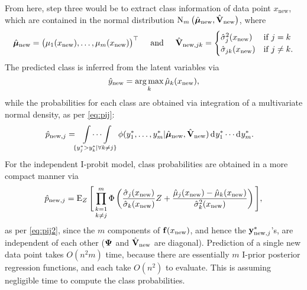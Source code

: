 From here, step three would be to extract class information of data point $x_\text{new}$, which are contained in the normal distribution $\operatorname{N}_{m}\big(\hat{{\bm\mu}}_{\text{new}}, \hat{{\mathbf V}}_{\text{new}} \big)$, where
\begin{equation*}
  \hat{{\bm\mu}}_{\text{new}} = \big(\mu_1(x_\text{new}),\dots, \mu_m(x_\text{new}) \big)^\top 
  \hspace{0.5cm}\text{and}\hspace{0.5cm}
  \hat{{\mathbf V}}_{{\text{new}},jk} = 
  \begin{cases}
    \hat\sigma_j^2(x_\text{new}) & \text{if } j = k \\
    \hat\sigma_{jk}(x_\text{new}) & \text{if } j \neq k. \\
  \end{cases}
\end{equation*}
The predicted class is inferred from the latent variables via
\[
  \hat y_{\text{new}} = \operatorname*{arg\,max}_k \hat\mu_k(x_{\text{new}}), 
\]
while the probabilities for each class are obtained via integration of a multivariate normal density, as per \cref{eq:pij}:
\begin{align}
  \hat p_{\text{new},j} 
  &=  \idotsint\displaylimits_{\{y^*_j > y^*_k | \forall k \neq j \}} \phi(y_{1}^*, \dots, y_{m}^*|\hat{{\bm\mu}}_{\text{new}}, \hat{{\mathbf V}}_{{\text{new}}}) \operatorname{d}\hspace{0.5pt}\! y_{1}^* \cdots \operatorname{d}\hspace{0.5pt}\! y_{m}^*.
\end{align}
For the independent I-probit model, class probabilities are obtained in a more compact manner via
\[
  \hat p_{\text{new},j} 
  = \operatorname{E}_Z \Bigg[ \mathop{\prod_{k=1}^m}_{k\neq j} 
  \Phi \left(\frac{\hat\sigma_j(x_\text{new})}{\hat\sigma_k(x_\text{new})} Z + \frac{\hat\mu_j(x_{\text{new}}) - \hat\mu_k(x_{\text{new}})}{\hat\sigma_k^2(x_\text{new})} \right) \Bigg],
\]
as per \cref{eq:pij2}, since the $m$ components of ${\mathbf f}(x_{\text{new}})$, and hence the ${\mathbf y}^*_{{\text{new}},j}$'s, are independent of each other (${\bm\Psi}$ and $\hat{{\mathbf V}}_{\text{new}}$ are diagonal).
Prediction of a single new data point takes $O(n^2m)$ time, because there are essentially $m$ I-prior posterior regression functions, and each take $O(n^2)$ to evaluate.
This is assuming negligible time to compute the class probabilities.

